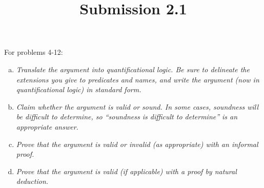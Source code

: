 \documentclass{article}
\title{Submission 2.1}
\date{}
\begin{document}
\maketitle

\begin{flushleft}
      For problems 4-12:
\end{flushleft}
\begin{enumerate}[(a)]
      \item \textit{Translate the argument into quantificational logic. Be sure to delineate the extensions you give to predicates and names, and write the argument (now in quantificational logic) in standard form.}
      \item \textit{Claim whether the argument is valid or sound. In some cases, soundness will be difficult to determine, so “soundness is difficult to determine” is an appropriate answer.}
      \item \textit{Prove that the argument is valid or invalid (as appropriate) with an informal proof.}
      \item \textit{Prove that the argument is valid (if applicable) with a proof by natural deduction.}
\end{enumerate}
\end{document}
